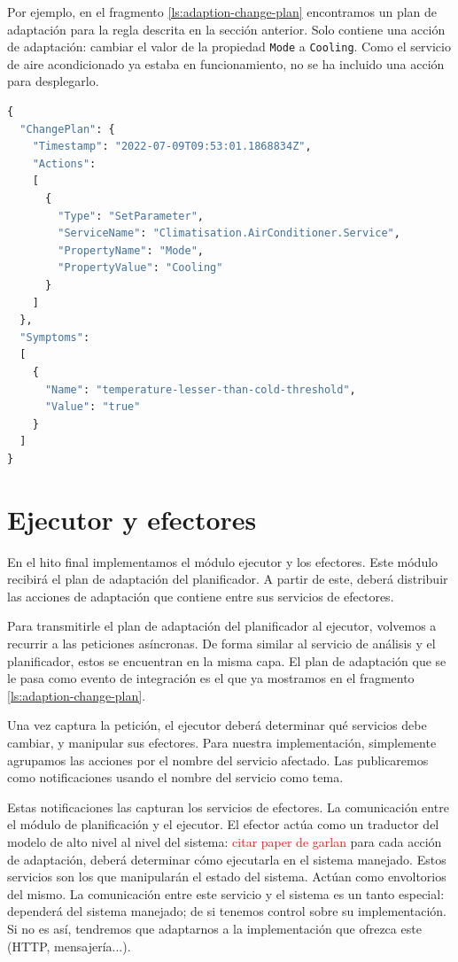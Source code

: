 Por ejemplo, en el fragmento \ref{ls:adaption-change-plan} encontramos un plan de adaptación para la regla descrita en la sección anterior. Solo contiene una acción de adaptación: cambiar el valor de la propiedad \texttt{Mode} a \texttt{Cooling}. Como el servicio de aire acondicionado ya estaba en funcionamiento, no se ha incluido una acción para desplegarlo.

\begin{lstlisting}[language=python,caption={Plan de adaptación generado para la regla anterior. Solo contiene una acción de adaptación: cambiar la configuración \texttt{Mode} del servicio \texttt{AirConditioner}.},captionpos=b, label=ls:adaption-change-plan]
{
  "ChangePlan": {
    "Timestamp": "2022-07-09T09:53:01.1868834Z",
    "Actions":
    [
      {
        "Type": "SetParameter",
        "ServiceName": "Climatisation.AirConditioner.Service",
        "PropertyName": "Mode",
        "PropertyValue": "Cooling"
      }
    ]
  },
  "Symptoms":
  [
    {
      "Name": "temperature-lesser-than-cold-threshold",
      "Value": "true"
    }
  ]
}
\end{lstlisting}

\section{Ejecutor y efectores}

En el hito final implementamos el módulo ejecutor y los efectores. Este módulo recibirá el plan de adaptación del planificador. A partir de este, deberá distribuir las acciones de adaptación que contiene entre sus servicios de efectores.

Para transmitirle el plan de adaptación del planificador al ejecutor, volvemos a recurrir a las peticiones asíncronas. De forma similar al servicio de análisis y el planificador, estos se encuentran en la misma capa. El plan de adaptación que se le pasa como evento de integración es el que ya mostramos en el fragmento \ref{ls:adaption-change-plan}.

Una vez captura la petición, el ejecutor deberá determinar qué servicios debe cambiar, y manipular sus efectores. Para nuestra implementación, simplemente agrupamos las acciones por el nombre del servicio afectado. Las publicaremos como notificaciones usando el nombre del servicio como tema.

Estas notificaciones las capturan los servicios de efectores.
La comunicación entre el módulo de planificación  y el ejecutor. El efector actúa como un traductor del modelo de alto nivel al nivel del sistema: \textcolor{red}{citar paper de garlan} para cada acción de adaptación, deberá determinar cómo ejecutarla en el sistema manejado. Estos servicios son los que manipularán el estado del sistema. Actúan como envoltorios del mismo. La comunicación entre este servicio y el sistema es un tanto especial: dependerá del sistema manejado; de si tenemos control sobre su implementación. Si no es así, tendremos que adaptarnos a la implementación que ofrezca este (HTTP, mensajería...).


